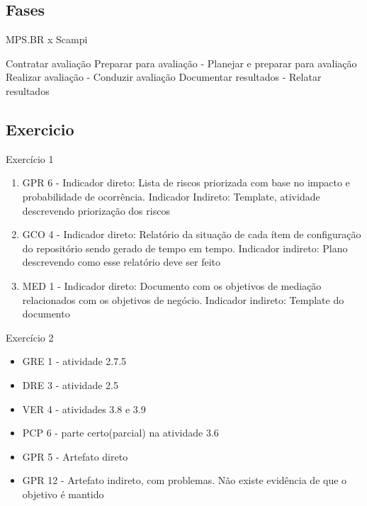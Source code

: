 \documentclass{article}
\begin{document}
\subsection{Fases}
	MPS.BR x Scampi
	
	Contratar avaliação		
	Preparar para avaliação	- Planejar e preparar para avaliação
	Realizar avaliação		- Conduzir avaliação
	Documentar resultados	- Relatar resultados

\subsection{Exercicio}
	Exercício 1	
	\begin{enumerate}
	\item GPR 6 - Indicador direto: Lista de riscos priorizada com base no impacto e probabilidade de ocorrência. Indicador Indireto: Template, atividade descrevendo priorização dos riscos 
	\item GCO 4 - Indicador direto: Relatório da situação de cada ítem de configuração do repositório sendo gerado de tempo em tempo. Indicador indireto: Plano descrevendo como esse relatório deve ser feito
	\item MED 1 - Indicador direto: Documento com os objetivos de mediação relacionados com os objetivos de negócio. Indicador indireto: Template do documento
	\end{enumerate}
	Exercício 2
	\begin{itemize}
	\item GRE 1 - atividade 2.7.5
	\item DRE 3 - atividade 2.5
	\item VER 4 - atividades 3.8 e 3.9
	\item PCP 6 - parte certo(parcial) na atividade 3.6
	\item GPR 5 - Artefato direto
	\item GPR 12 - Artefato indireto, com problemas. Não existe evidência de que o objetivo é mantido
	\end{itemize}		
\end{document}
